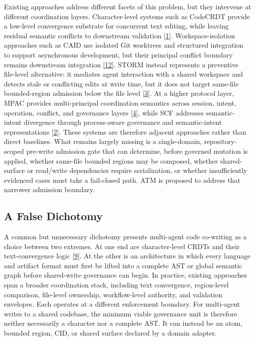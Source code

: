 \documentclass[9pt,letterpaper]{extarticle}
\begin{document}
Existing approaches address different facets of this problem, but they intervene at different coordination layers. Character-level systems such as CodeCRDT provide a low-level convergence substrate for concurrent text editing, while leaving residual semantic conflicts to downstream validation \textcolor{atmLinkBlue}{\hyperlink{Item.37}{[1]}}. Workspace-isolation approaches such as CAID use isolated Git worktrees and structured integration to support asynchronous development, but their principal conflict boundary remains downstream integration \textcolor{atmLinkBlue}{\hyperlink{Item.48}{[12]}}. STORM instead represents a preventive file-level alternative: it mediates agent interaction with a shared workspace and detects stale or conflicting edits at write time, but it does not target same-file bounded-region admission below the file level \textcolor{atmLinkBlue}{\hyperlink{Item.39}{[3]}}. At a higher protocol layer, MPAC provides multi-principal coordination semantics across session, intent, operation, conflict, and governance layers \textcolor{atmLinkBlue}{\hyperlink{Item.40}{[4]}}, while SCF addresses semantic-intent divergence through process-aware governance and semantic-intent representations \textcolor{atmLinkBlue}{\hyperlink{Item.38}{[2]}}. These systems are therefore adjacent approaches rather than direct baselines. What remains largely missing is a single-domain, repository-scoped pre-write admission gate that can determine, before governed mutation is applied, whether same-file bounded regions may be composed, whether shared-surface or read/write dependencies require serialization, or whether insufficiently evidenced cases must take a fail-closed path. ATM is proposed to address that narrower admission boundary.

\subsection{A False Dichotomy}

A common but unnecessary dichotomy presents multi-agent code co-writing as a choice between two extremes. At one end are character-level CRDTs and their text-convergence logic \textcolor{atmLinkBlue}{\hyperlink{Item.45}{[9]}}. At the other is an architecture in which every language and artifact format must first be lifted into a complete AST or global semantic graph before shared-write governance can begin. In practice, existing approaches span a broader coordination stack, including text convergence, region-level comparison, file-level ownership, workflow-level authority, and validation envelopes. Each operates at a different enforcement boundary. For multi-agent writes to a shared codebase, the minimum viable governance unit is therefore neither necessarily a character nor a complete AST. It can instead be an atom, bounded region, CID, or shared surface declared by a domain adapter.
\end{document}
